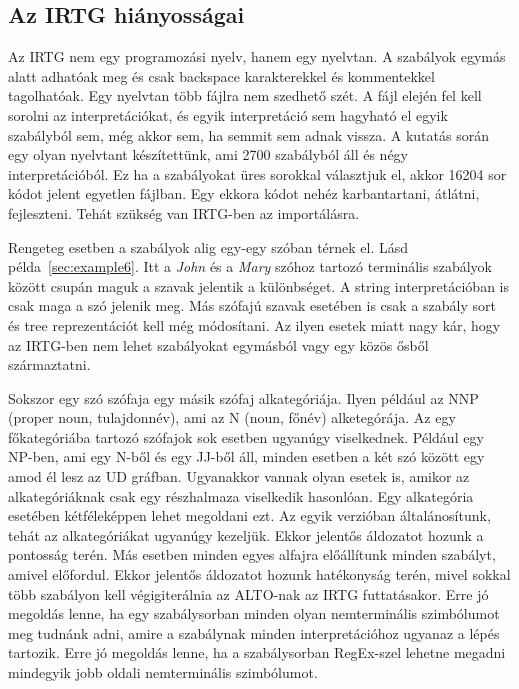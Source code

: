 \subsection{Az IRTG hiányosságai}
\label{sec:IRTGshortcomming}

Az IRTG nem egy programozási nyelv, hanem egy nyelvtan. A szabályok egymás alatt adhatóak meg és csak backspace karakterekkel és kommentekkel tagolhatóak. Egy nyelvtan több fájlra nem szedhető szét. A fájl elején fel kell sorolni az interpretációkat, és egyik interpretáció sem hagyható el egyik szabályból sem, még akkor sem, ha semmit sem adnak vissza. A kutatás során egy olyan nyelvtant készítettünk, ami 2700 szabályból áll és négy interpretációból. Ez ha a szabályokat üres sorokkal választjuk el, akkor 16204 sor kódot jelent egyetlen fájlban. Egy ekkora kódot nehéz karbantartani, átlátni, fejleszteni. Tehát szükség van IRTG-ben az importálásra.


Rengeteg esetben a szabályok alig egy-egy szóban térnek el. Lásd példa~\ref{sec:example6}.
Itt a \textit{John} és a \textit{Mary} szóhoz tartozó terminális szabályok között csupán maguk a szavak jelentik a különbséget. A string interpretációban is csak maga a szó jelenik meg. Más szófajú szavak esetében is csak a szabály sort és tree reprezentációt kell még módosítani. Az ilyen esetek miatt nagy kár, hogy az IRTG-ben nem lehet szabályokat egymásból vagy egy közös ősből származtatni.


Sokszor egy szó szófaja egy másik szófaj alkategóriája. Ilyen például az NNP (proper noun, tulajdonnév), ami az N (noun, főnév) alketegórája. Az egy főkategóriába tartozó szófajok sok esetben ugyanúgy viselkednek. Például egy NP-ben, ami egy N-ből és egy JJ-ből áll, minden esetben a két szó között egy amod él lesz az UD gráfban. Ugyanakkor vannak olyan esetek is, amikor az alkategóriáknak csak egy részhalmaza viselkedik hasonlóan. Egy alkategória esetében kétféleképpen lehet megoldani ezt. Az egyik verzióban általánosítunk, tehát az alkategóriákat ugyanúgy kezeljük. Ekkor jelentős áldozatot hozunk a pontosság terén. Más esetben minden egyes alfajra előállítunk minden szabályt, amivel előfordul. Ekkor jelentős áldozatot hozunk hatékonyság terén, mivel sokkal több szabályon kell végigiterálnia az ALTO-nak az IRTG futtatásakor. Erre jó megoldás lenne, ha egy szabálysorban minden olyan nemterminális szimbólumot meg tudnánk adni, amire a szabálynak minden interpretációhoz ugyanaz a lépés tartozik. Erre jó megoldás lenne, ha a szabálysorban RegEx-szel lehetne megadni mindegyik jobb oldali nemterminális szimbólumot.


